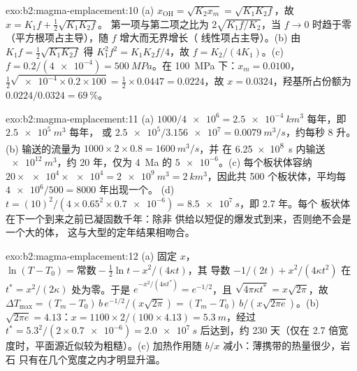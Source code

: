 \begin{solution}{exo:b2:magma-emplacement:10}
(a) $x_{\mathrm{OH}} = \sqrt{K_2x_m} = \sqrt{K_1K_2f}$，故 $x = K_1f + \frac12\sqrt{K_1K_2f}$。
第一项与第二项之比为 $2\sqrt{K_1f/K_2}$，当
$f \to 0$ 时趋于零（平方根项占主导），随 $f$ 增大而无界增长（
线性项占主导）。(b) 由 $K_1 f = \frac12\sqrt{K_1K_2 f}$ 得 $K_1^2f^2 =
K_1K_2f/4$，故 $f = K_2/(4K_1)$。(c) $f = 0.2/(\num{4e-4}) = \qty{500}{MPa}$。在
\qty{100}{MPa} 下：$x_m = 0.0100$，$\frac12\sqrt{\num{e-4}\times0.2\times100} =
\frac12\times0.0447 = 0.0224$，故 $x = 0.0324$，羟基所占份额为
$0.0224/0.0324 = \qty{69}{\percent}$。
\end{solution}

\begin{solution}{exo:b2:magma-emplacement:11}
(a) $1000/\num{4e6} = \qty{2.5e-4}{km^3}$ 每年，即 $\qty{2.5e5}{m^3}$ 每年，
或 $\num{2.5e5}/\num{3.156e7} = \qty{0.0079}{m^3/s}$，约每秒 8 升。
(b) 输送的流量为 $1000\times2\times0.8 = \qty{1600}{m^3/s}$，并
在 \qty{6.25e8}{s} 内输送 $\qty{e12}{m^3}$，约 20 年，仅为
\qty{4}{Ma} 的 $\num{5e-6}$。(c) 每个板状体容纳 $20\times\num{e4}\times\num{e4} = \qty{2e9}{m^3} =
\qty{2}{km^3}$，因此共 500 个板状体，平均每 $\num{4e6}/500 = 8000$ 年出现一个。
(d) $t = (10)^2/(4\times0.65^2\times\num{0.7e-6}) = \qty{8.5e7}{s}$，即 2.7 年。每个
板状体在下一个到来之前已凝固数千年：除非
供给以短促的爆发式到来，否则绝不会是一个大的体，
这与大型的定年结果相吻合。
\end{solution}

\begin{solution}{exo:b2:magma-emplacement:12}
(a) 固定 $x$，$\ln(T - T_0) = \text{常数} - \frac12\ln t - x^2/(4\kappa t)$，其
导数 $-1/(2t) + x^2/(4\kappa t^2)$ 在 $t^* = x^2/(2\kappa)$ 处为零。于是
$e^{-x^2/(4\kappa t^*)} = e^{-1/2}$，且 $\sqrt{4\pi\kappa t^*} = x\sqrt{2\pi}$，故 $\Delta
T_{\max} = (T_m - T_0)\,b\,e^{-1/2}/(x\sqrt{2\pi}) = (T_m - T_0)\,b/(x\sqrt{2\pi e})$。(b)
$\sqrt{2\pi e} = 4.13$：$x = 1100\times2/(100\times4.13) = \qty{5.3}{m}$，经过
$t^* = 5.3^2/(2\times\num{0.7e-6}) = \qty{2.0e7}{s}$ 后达到，约 230 天（仅在 2.7
倍宽度时，平面源近似较为粗糙）。(c) 加热作用随
$b/x$ 减小：薄携带的热量很少，岩石
只有在几个宽度之内才明显升温。
\end{solution}

